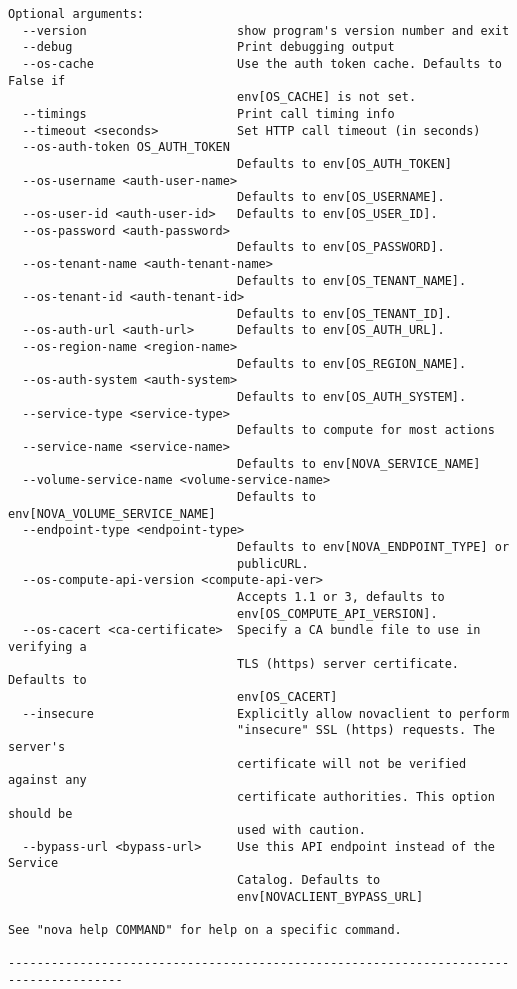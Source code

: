 \documentclass[a4paper,left=1.5cm,right=1.5cm,11pt]{article}
\begin{document}
\begin{lstlisting}
Optional arguments:
  --version                     show program's version number and exit
  --debug                       Print debugging output
  --os-cache                    Use the auth token cache. Defaults to False if
                                env[OS_CACHE] is not set.
  --timings                     Print call timing info
  --timeout <seconds>           Set HTTP call timeout (in seconds)
  --os-auth-token OS_AUTH_TOKEN
                                Defaults to env[OS_AUTH_TOKEN]
  --os-username <auth-user-name>
                                Defaults to env[OS_USERNAME].
  --os-user-id <auth-user-id>   Defaults to env[OS_USER_ID].
  --os-password <auth-password>
                                Defaults to env[OS_PASSWORD].
  --os-tenant-name <auth-tenant-name>
                                Defaults to env[OS_TENANT_NAME].
  --os-tenant-id <auth-tenant-id>
                                Defaults to env[OS_TENANT_ID].
  --os-auth-url <auth-url>      Defaults to env[OS_AUTH_URL].
  --os-region-name <region-name>
                                Defaults to env[OS_REGION_NAME].
  --os-auth-system <auth-system>
                                Defaults to env[OS_AUTH_SYSTEM].
  --service-type <service-type>
                                Defaults to compute for most actions
  --service-name <service-name>
                                Defaults to env[NOVA_SERVICE_NAME]
  --volume-service-name <volume-service-name>
                                Defaults to env[NOVA_VOLUME_SERVICE_NAME]
  --endpoint-type <endpoint-type>
                                Defaults to env[NOVA_ENDPOINT_TYPE] or
                                publicURL.
  --os-compute-api-version <compute-api-ver>
                                Accepts 1.1 or 3, defaults to
                                env[OS_COMPUTE_API_VERSION].
  --os-cacert <ca-certificate>  Specify a CA bundle file to use in verifying a
                                TLS (https) server certificate. Defaults to
                                env[OS_CACERT]
  --insecure                    Explicitly allow novaclient to perform
                                "insecure" SSL (https) requests. The server's
                                certificate will not be verified against any
                                certificate authorities. This option should be
                                used with caution.
  --bypass-url <bypass-url>     Use this API endpoint instead of the Service
                                Catalog. Defaults to
                                env[NOVACLIENT_BYPASS_URL]

See "nova help COMMAND" for help on a specific command.

--------------------------------------------------------------------------------------
\end{lstlisting}
\end{document}
